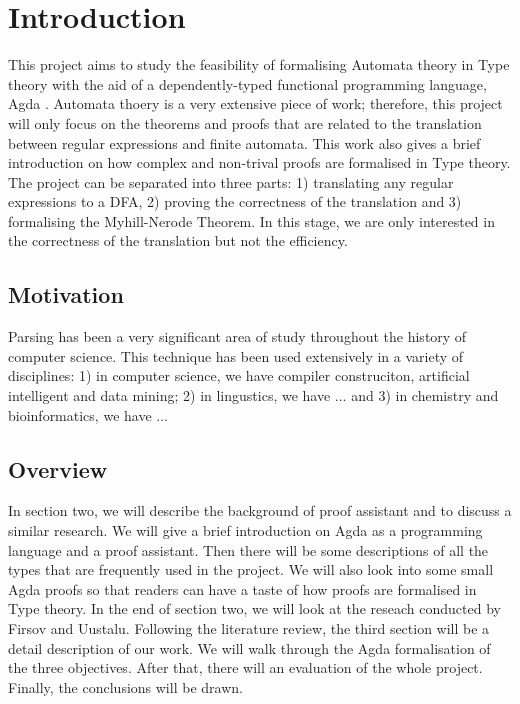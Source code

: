 \documentclass[twoside,openright,final]{bhamthesis}
\begin{document}
\section{Introduction}
\par This project aims to study the feasibility of formalising
Automata theory in Type theory with the aid of a dependently-typed
functional programming language, Agda \cite{agdawiki2016}. Automata thoery is a very
extensive piece of work; therefore, this project will only focus on the theorems and
proofs that are related to the translation between regular expressions
and finite automata. This work also gives a brief introduction
on how complex and non-trival proofs are formalised in Type
theory. The project can be separated into three parts: 1) translating any regular expressions to
a DFA, 2) proving the correctness of the translation and 3)
formalising the Myhill-Nerode Theorem. In this stage, we are only
interested in the correctness of the translation but not the
efficiency. 

\subsection{Motivation}
\par Parsing has been a very significant area of study throughout the
history of computer science. This technique has been used extensively
in a variety of disciplines: 1) in computer science, we have
compiler construciton, artificial intelligent and data mining; 2) in
lingustics, we have ... and 3) in chemistry and bioinformatics, we have ...

\subsection{Overview}
\par In section two, we will describe the background of proof assistant
and to discuss a similar research. We will give a brief introduction on
Agda as a programming language and a proof assistant. Then there will
be some descriptions of all the types that are frequently used in the project. We
will also look into some small Agda proofs so that readers can
have a taste of how proofs are formalised in Type
theory. In the end of section two, we will look at the reseach
\cite{firsov2013} conducted by Firsov and Uustalu. Following the
literature review, the third section will
be a detail description of our work. We will walk through the Agda
formalisation of the three objectives. After that, there will an evaluation
of the whole project. Finally, the conclusions will be
drawn. 
\end{document}
